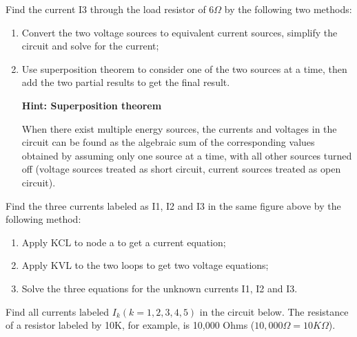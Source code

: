 \begin{enumerate}
\end{enumerate}


\item Find the current I3 through the load resistor of 6$\Omega$ by the
following two methods:
\begin{enumerate}
\item Convert the two voltage sources to equivalent current sources, 
	simplify the circuit and solve for the current;
\item Use superposition theorem to consider one of the two sources at a
  time, then add the two partial results to get the final result.

{\bf Hint: Superposition theorem}

When there exist multiple energy sources, the currents and voltages in 
the circuit can be found as the algebraic sum of the corresponding values 
obtained by assuming only one source at a time, with all other sources 
turned off (voltage sources treated as short circuit, current sources 
treated as open circuit).

\end{enumerate}



\item Find the three currents labeled as I1, I2 and I3 in the same figure 
	above by the following method:
\begin{enumerate}
\item Apply KCL to node a to get a current equation;
\item Apply KVL to the two loops to get two voltage equations;
\item Solve the three equations for the unknown currents I1, I2 and I3.
\end{enumerate}


\item Find all currents labeled $I_k (k=1,2,3,4,5)$ in the circuit below. 
The resistance of a resistor labeled by 10K, for example, is 10,000
Ohms ($10,000 \Omega=10K\Omega$).

